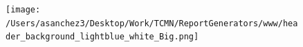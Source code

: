 \documentclass{article}\usepackage[]{graphicx}\usepackage[]{color}
\begin{document}
%

\begin{figure}
  \vspace{-3ex} %
\end{figure}

\begin{figure}
  \vspace{-1ex} %
  \texttt{[image: /Users/asanchez3/Desktop/Work/TCMN/ReportGenerators/www/header\_background\_lightblue\_white\_Big.png]}
\end{figure}
\end{document}
